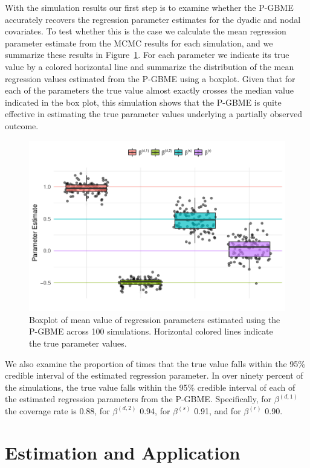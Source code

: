 \documentclass[a4paper, 12pt]{article}
\begin{document}
With the simulation results our first step is to examine whether the P-GBME accurately recovers the regression parameter estimates for the dyadic and nodal covariates. To test whether this is the case we calculate the mean regression parameter estimate from the MCMC results for each simulation, and we summarize these results in Figure~\ref{fig:simBias}. For each parameter we indicate its true value by a colored horizontal line and summarize the distribution of the mean regression values estimated from the P-GBME using a boxplot. Given that for each of the parameters the true value almost exactly crosses the median value indicated in the box plot, this simulation shows that the P-GBME is quite effective in estimating the true parameter values underlying a partially observed outcome. 

\begin{figure}[ht]
  \centering
  \includegraphics[width=1\textwidth]{figureA1.pdf}
  \caption{Boxplot of mean value of regression parameters estimated using the P-GBME across 100 simulations. Horizontal colored lines indicate the true parameter values.}
  \label{fig:simBias}
\end{figure}
\FloatBarrier

We also examine the proportion of times that the true value falls within the 95\% credible interval of the estimated regression parameter. In over ninety percent of the simulations, the true value falls within the 95\% credible interval of each of the estimated regression parameters from the P-GBME. Specifically, for $\beta^{(d,1)}$ the coverage rate is 0.88, for $\beta^{(d,2)}$ 0.94, for $\beta^{(s)}$ 0.91, and for $\beta^{(r)}$ 0.90.

\section{Estimation and Application}
\end{document}
